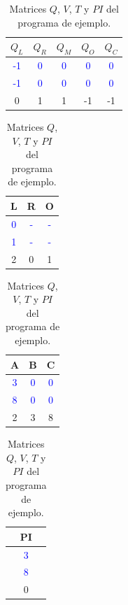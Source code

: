 \newcommand{\PlonkFormulaPI}{
$${Q_L}_i \cdot A_i + {Q_R}_i \cdot B_i + Q_M\cdot A_i\cdot B_i + Q_O\cdot C_i + Q_C + PI_i = 0 ~~ \forall i$$
}


\begin{table}
\centering
\begin{minipage}{0.45\textwidth}
\centering
\begin{tabular}{ccccc}
\toprule
\textbf{$Q_L$} & \textbf{$Q_R$} & \textbf{$Q_M$} & \textbf{$Q_O$} & \textbf{$Q_C$} \\
\midrule
\textcolor{blue}{-1} & \textcolor{blue}{0} & \textcolor{blue}{0} & \textcolor{blue}{0} & \textcolor{blue}{0} \\
\textcolor{blue}{-1} & \textcolor{blue}{0} & \textcolor{blue}{0} & \textcolor{blue}{0} & \textcolor{blue}{0} \\
0 & 1 & 1 & -1 & -1 \\
\bottomrule
\end{tabular}
\end{minipage}%
\hspace{0.5cm}  
\begin{minipage}{0.45\textwidth}
\centering
\begin{tabular}{ccc}
\toprule
L & R & O \\
\midrule
\textcolor{blue}{0} & \textcolor{blue}{-} & \textcolor{blue}{-} \\
\textcolor{blue}{1} & \textcolor{blue}{-} & \textcolor{blue}{-} \\
2 & 0 & 1 \\
\bottomrule
\end{tabular}
\end{minipage}

\vspace{0.5cm}  

\begin{minipage}{0.45\textwidth}
\centering
\begin{tabular}{ccc}
\toprule
A & B & C \\
\midrule
\textcolor{blue}{3} & \textcolor{blue}{0} & \textcolor{blue}{0} \\
\textcolor{blue}{8} & \textcolor{blue}{0} & \textcolor{blue}{0} \\
2 & 3 & 8 \\
\bottomrule
\end{tabular}
\end{minipage}%
\hspace{0.5cm}  
\begin{minipage}{0.45\textwidth}
\centering
\begin{tabular}{c}
\toprule
PI\\
\midrule
\textcolor{blue}{3} \\
\textcolor{blue}{8} \\
0 \\
\bottomrule
\end{tabular}
\end{minipage}

\caption{Matrices $Q$, $V$, $T$ y $PI$ del programa de ejemplo.}
\label{tab:matrices_completas_con_pi}
\end{table}

